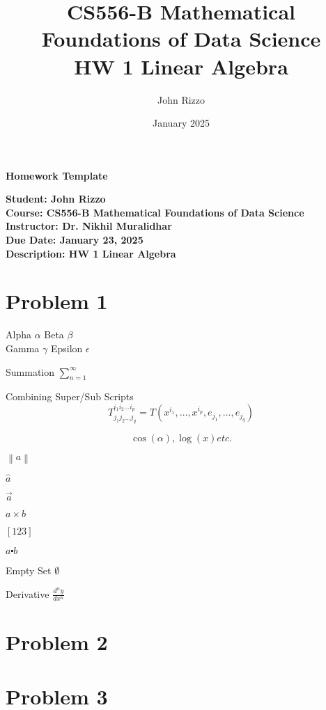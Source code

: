 \documentclass[12pt, letterpaper]{article}
\title{CS556-B Mathematical Foundations of Data Science \\ HW 1 Linear Algebra}
\author{John Rizzo}
\date{January 2025}
\newcommand{\studentname}{John Rizzo}
\newcommand{\classname}{CS556-B Mathematical Foundations of Data Science}
\newcommand{\professorname}{Dr. Nikhil Muralidhar}
\newcommand{\assignmentdescription}{HW 1 Linear Algebra}
\newcommand{\duedate}{January 23, 2025}
\begin{document}
\begin{center}
    \Large \textbf{Homework Template} \\ [10pt]
\end{center}
\vspace{0.5cm}

\noindent
\normalsize \textbf{Student: \studentname} \\ [5pt]
\textbf{Course: \classname} \\ [5pt]
\textbf{Instructor: \professorname} \\ [5pt]
\textbf{Due Date: \duedate} \\ [5pt]
\textbf{Description: \assignmentdescription}

\vspace{0.5cm}

\section*{Problem 1}

Alpha $\alpha$ Beta $\beta$ \\ Gamma $\gamma$ Epsilon $\epsilon$

Summation $\sum_{n = 1}^{\infty}$

Combining Super/Sub Scripts \[ T^{i_1 i_2 \dots i_p}_{j_1 j_2 \dots j_q} = T(x^{i_1},\dots,x^{i_p},e_{j_1},\dots,e_{j_q}) \]

\[ \cos(\alpha), \log(x) etc. \] 

$\left\lVert a \right\rVert$

$\hat{a}$ 

$\vec{a}$

$a \times b$

$\left[ 1 2 3\right]$

$a \centerdot b$

Empty Set $\emptyset$

Derivative $\frac{d^n y}{d x^n}$

\vspace{1cm}

\section*{Problem 2}

\vspace{1cm}

\section*{Problem 3}

\vspace{1cm}

\end{document}
